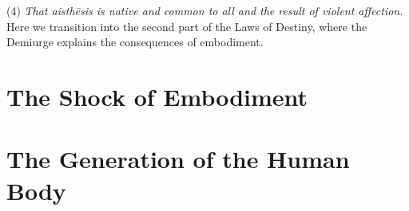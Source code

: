 (4) \emph{That \emph{aisthēsis} is native and common to all and the result of violent affection.} Here we transition into the second part of the Laws of Destiny, where the Demiurge explains the consequences of embodiment. 


\section{The Shock of Embodiment} %
\label{sec:the_shock_of_embodiment}




\section{The Generation of the Human Body} %
\label{sec:structuring_the_human_body}





